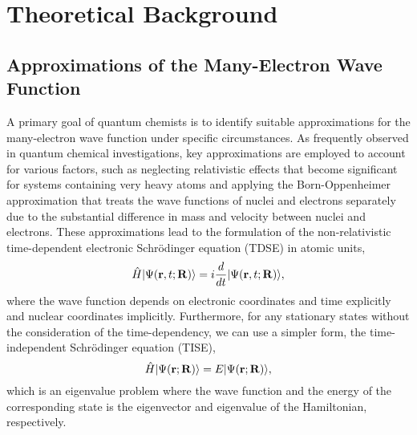 \chapter{Theoretical Background}  \label{theory} 
\section{Approximations of the Many-Electron Wave Function}\label{approx-wfn}
A primary goal of quantum chemists is to identify suitable approximations for the many-electron wave function under specific circumstances. As frequently observed in quantum chemical investigations, key approximations are employed to account for various factors, such as neglecting relativistic effects\cite{Pitzer1979} that become significant for systems containing very heavy atoms and applying the Born-Oppenheimer approximation\cite{Born1927} that treats the wave functions of nuclei and electrons separately due to the substantial difference in mass and velocity between nuclei and electrons. These approximations lead to the formulation of the non-relativistic time-dependent electronic Schr\"odinger equation\cite{Schrodinger1982} (TDSE) in atomic units,
\begin{equation}
\hat{H}| \Psi(\mathbf{r}, t; \mathbf{R}) \rangle = i\frac{d}{dt}| \Psi(\mathbf{r}, t; \mathbf{R}) \rangle,
\end{equation}
where the wave function depends on electronic coordinates and time explicitly and nuclear coordinates implicitly. Furthermore, for any stationary states without the consideration of the time-dependency, we can use a simpler form, the time-independent Schr\"odinger equation (TISE), 
\begin{equation}
\hat{H}| \Psi(\mathbf{r}; \mathbf{R}) \rangle = E| \Psi(\mathbf{r}; \mathbf{R}) \rangle,
\end{equation}
which is an eigenvalue problem where the wave function and the energy of the corresponding state is the eigenvector and eigenvalue of the Hamiltonian, respectively.  

